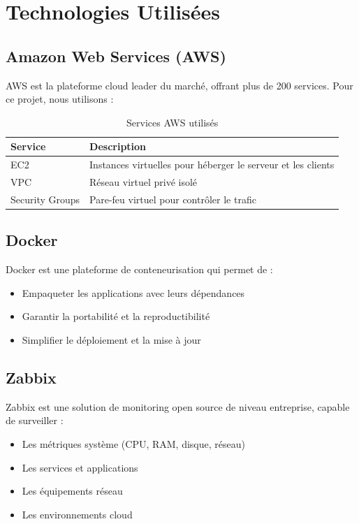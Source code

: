 \section{Technologies Utilisées}

\subsection{Amazon Web Services (AWS)}

AWS est la plateforme cloud leader du marché, offrant plus de 200 services. Pour ce projet, nous utilisons :

\begin{table}[H]
\centering
\caption{Services AWS utilisés}
\label{tab:aws-services}
\begin{tabular}{|l|p{10cm}|}
\hline
\textbf{Service} & \textbf{Description} \\
\hline
EC2 & Instances virtuelles pour héberger le serveur et les clients \\
\hline
VPC & Réseau virtuel privé isolé \\
\hline
Security Groups & Pare-feu virtuel pour contrôler le trafic \\
\hline
\end{tabular}
\end{table}

\subsection{Docker}

Docker est une plateforme de conteneurisation qui permet de :
\begin{itemize}
    \item Empaqueter les applications avec leurs dépendances
    \item Garantir la portabilité et la reproductibilité
    \item Simplifier le déploiement et la mise à jour
\end{itemize}

\subsection{Zabbix}

Zabbix est une solution de monitoring open source de niveau entreprise, capable de surveiller :
\begin{itemize}
    \item Les métriques système (CPU, RAM, disque, réseau)
    \item Les services et applications
    \item Les équipements réseau
    \item Les environnements cloud
\end{itemize}

